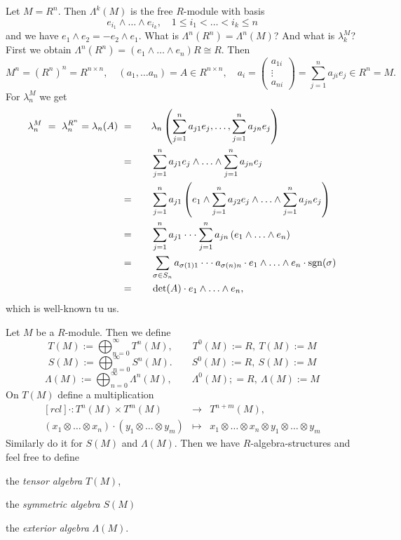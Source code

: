 \documentclass[11pt]{book}
\theoremstyle{nonumberbreak}
\newenvironment{defin}[1][]{\ifthenelse{\equal{#1}{}}{\definition}{\definition[#1]}\rm}{\enddefinition}
\newenvironment{ex}[1][]{\ifthenelse{\equal{#1}{}}{\example}{\example[#1]}\rm}{\endexample}
\begin{document}
\begin{spacing}{1.3}
\begin{ex} %
Let $M=R^n$. Then $\Lambda^k(M)$ is the free $R$-module with basis 
$$e_{i_1} \wedge \ldots \wedge e_{i_k}, \quad 1 \leqslant i_1 < \ldots < i_k \leqslant n$$
and we have $e_1 \wedge e_2=-e_2 \wedge e_1$. 
What is $\Lambda^n(R^n)=\Lambda^n(M)$? And what is $\lambda_k^M$?
First we obtain $\Lambda^n(R^n)=(e_1 \wedge \ldots \wedge e_n)R \cong R$. Then 
$$M^n=(R^n)^n=R^{n \times n}, \quad (a_1, \ldots a_n)=A \in R^{n \times n}, \quad a_i = \begin{pmatrix} a_{1i} \\ \vdots \\ a_{ni} \end{pmatrix}=\sum_{j=1}^n a_{ji}e_j \in R^n=M.$$
For $\lambda_n^M$ we get
\begin{alignat*}{8}
\lambda_n^M\ =\ \lambda_n^{R^n}=\lambda_n(A)\ &=&&\quad \lambda_n \left( \sum_{j=1}^n a_{j1}e_j, \ldots, \sum_{j=1}^n a_{jn}e_j \right)\\
&=&& \quad \sum_{j=1}^n a_{j1} e_j \wedge \ldots \wedge \sum_{j=1}^n a_{jn}e_j \\
&=&&\quad \sum_{j=1}^n a_{j1} \left( e_1 \wedge \sum_{j=1}^n a_{j2}e_j \wedge \ldots \wedge \sum_{j=1}^n a_{jn}e_j \right)\\
&=&& \quad  \sum_{j=1}^n a_{j1} \cdot \cdot \cdot \sum_{j=1}^n a_{jn} \left(e_1 \wedge \ldots \wedge e_n \right)\\
&=&&\quad \sum_{\sigma \in S_n} a_{\sigma(1)1} \cdot \cdot \cdot a_{\sigma(n)n} \cdot e_1 \wedge \ldots \wedge e_n \cdot \rm{sgn}(\sigma)\\
&=&&\quad \det(A) \cdot e_1 \wedge \ldots \wedge e_n,
\end{alignat*}
which is well-known tu us.
\end{ex}

\begin{defin} %
Let $M$ be a $R$-module. Then we define
$$T(M):= \bigoplus_{n=0}^{\infty} T^n(M), \qquad T^0(M):=R, \ T(M):=M$$
$$S(M):= \bigoplus_{n=0}^{\infty} S^n(M). \qquad S^0(M):=R, \ S(M):=M$$
$$\Lambda(M):= \bigoplus_{n=0}^{\infty} \Lambda^n(M), \qquad \Lambda^0(M);=R, \ \Lambda(M):=M$$
On $T(M)$ define a multiplication
$$\begin{matrix}[rcl]\cdot: T^n(M) \times T^m(M) &\longrightarrow &T^{n+m}(M), \\ (x_1 \otimes \ldots \otimes x_n) \cdot (y_1 \otimes \ldots\otimes y_m) & \mapsto & x_1 \otimes \ldots \otimes x_n \otimes y_1 \otimes \ldots \otimes y_m\end{matrix}$$
Similarly do it for $S(M)$ and $\Lambda(M)$. Then we have $R$-algebra-structures and feel free to define
\begin{compactenum}
\item the \textit{tensor algebra} $T(M)$,
\item the \textit{symmetric algebra} $S(M)$
\item the \textit{exterior algebra} $\Lambda(M)$.
\end{compactenum}
\end{defin}


\end{spacing}
\end{document}
